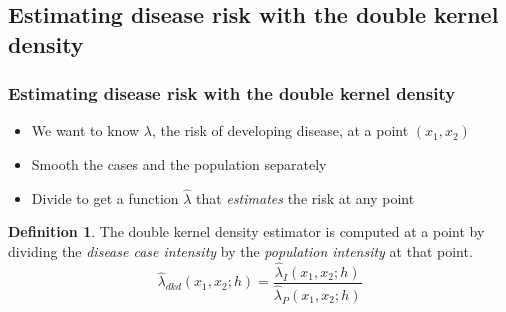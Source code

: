 \documentclass[notheorems]{beamer}
\theoremstyle{definition}
\newtheorem{definition}{Definition}
\theoremstyle{example}
\begin{document}
\subsection{Estimating disease risk with the double kernel density}
\begin{frame}\frametitle{Estimating disease risk with the double kernel density}
    \begin{itemize}
        \item We want to know $\lambda$, the risk of developing disease, at a point $(x_1,x_2)$
        \item Smooth the cases and the population separately
        \item Divide to get a function \textbf{$\hat{\lambda}$} that \emph{estimates} the risk at any point
    \end{itemize}
    \begin{definition}
        The \alert{double kernel density} estimator is computed at a point by dividing the \emph{disease case intensity} by the \emph{population intensity} at that point.
        \begin{equation*}
            \hat{\lambda}_{dkd}(x_1,x_2;h) = \frac{ \hat{\lambda}_{I}(x_1,x_2;h) } { \hat{\lambda}_{P}(x_1,x_2;h) }
        \end{equation*}
    \end{definition}
\end{frame}

\end{document}
